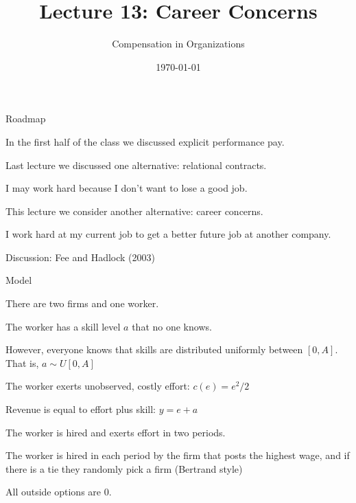 \documentclass[aspectratio=169,usenames,dvipsnames]{beamer}
\title[diss]{Lecture 13: Career Concerns} %
\author{Compensation in Organizations} %
\institute[shortinst]{Jacob Kohlhepp}
\date{\today} %
\newenvironment{wideitemize}{\itemize\addtolength{\itemsep}{10pt}}{\enditemize}
\begin{document}
\begin{frame}
\titlepage %

\end{frame}

\begin{frame}{Roadmap}
\begin{wideitemize}
    \item In the first half of the class we discussed explicit performance pay.
    \item Last lecture we discussed one alternative: relational contracts.
    \item I may work hard because I don't want to lose a good job.
    \item This lecture we consider another alternative: career concerns.
    \item I work hard at my current job to get a better future job at another company.
\end{wideitemize}
    
\end{frame}
\begin{frame}
\centering
    \huge Discussion: Fee and Hadlock (2003)

\end{frame}

\begin{frame}{Model}
    \begin{wideitemize}
        \item There are two firms and one worker.
        \item The worker has a skill level $a$ that no one knows.
        \item However, everyone knows that skills are distributed uniformly between $[0,A]$. That is, $a\sim U[0,A]$
        \item The worker exerts unobserved, costly effort: $c(e)=e^2/2$
        \item Revenue is equal to effort plus skill: $y=e+a$
        \item The worker is hired and exerts effort in two periods.
        \item The worker is hired in each period by the firm that posts the highest wage, and if there is a tie they randomly pick a firm (Bertrand style)
        \item All outside options are 0.
    \end{wideitemize}
\end{frame}
\end{document}
